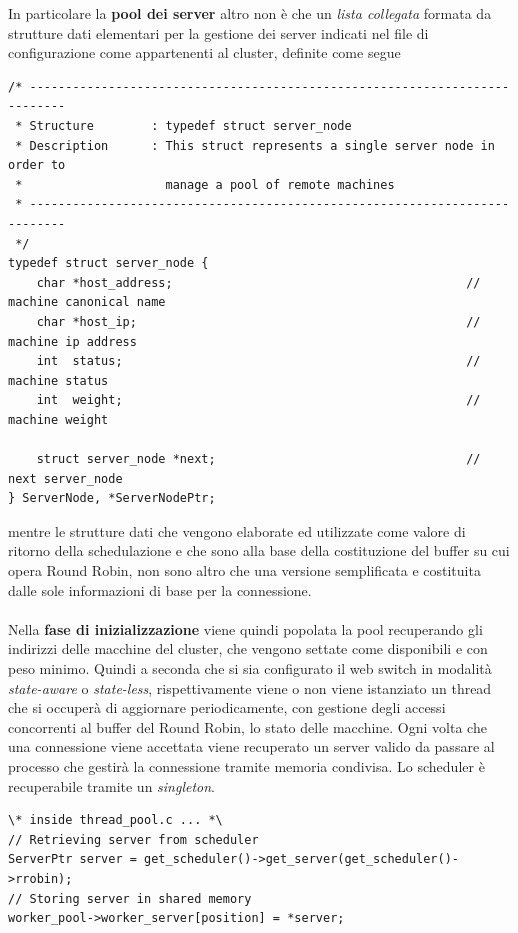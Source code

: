 \documentclass[italian]{tktltiki2}
\begin{document}
In particolare la \textbf{pool dei server} altro non è che un \emph{lista collegata} formata da strutture dati elementari per la gestione dei server indicati nel file di configurazione come appartenenti al cluster, definite come segue
\begin{lstlisting}
/* ---------------------------------------------------------------------------
 * Structure        : typedef struct server_node
 * Description      : This struct represents a single server node in order to
 *                    manage a pool of remote machines
 * ---------------------------------------------------------------------------
 */
typedef struct server_node {
    char *host_address;                                         // machine canonical name
    char *host_ip;                                              // machine ip address
    int  status;                                                // machine status
    int  weight;                                                // machine weight

    struct server_node *next;                                   // next server_node
} ServerNode, *ServerNodePtr;

\end{lstlisting}
mentre le strutture dati che vengono elaborate ed utilizzate come valore di ritorno della schedulazione e che sono alla base della costituzione del buffer su cui opera Round Robin, non sono altro che una versione semplificata e costituita dalle sole informazioni di base per la connessione. \\\\
Nella \textbf{fase di inizializzazione} viene quindi popolata la pool recuperando gli indirizzi delle macchine del cluster, che vengono settate come disponibili e con peso minimo. Quindi a seconda che si sia configurato il web switch in modalità \emph{state-aware} o \emph{state-less}, rispettivamente viene o non viene istanziato un thread che si occuperà di aggiornare periodicamente, con gestione degli accessi concorrenti al buffer del Round Robin, lo stato delle macchine. Ogni volta che una connessione viene accettata viene recuperato un server valido da passare al processo che gestirà la connessione tramite memoria condivisa. Lo scheduler è recuperabile tramite un \emph{singleton}.
\begin{lstlisting}
\* inside thread_pool.c ... *\
// Retrieving server from scheduler
ServerPtr server = get_scheduler()->get_server(get_scheduler()->rrobin);
// Storing server in shared memory
worker_pool->worker_server[position] = *server;
	
\end{lstlisting}
\end{document}
